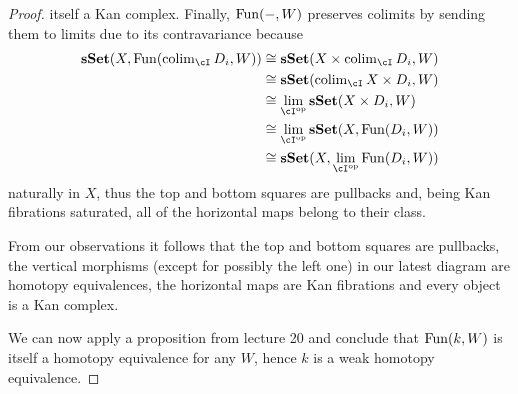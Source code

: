\documentclass[a4paper,11pt,openany]{scrartcl}
\begin{document}
\begin{proof}
    itself a Kan complex. Finally, $\operatorname{Fun}(-,W)$ preserves colimits by sending
    them to limits due to its contravariance because
    \begin{align*}
        \sSet(X,\Fun(\colim_{\cI}D_i,W))
        &\cong\sSet(X\times\colim_{\cI}D_i,W) \\
        &\cong\sSet(\colim_{\cI} X\times D_i,W) \\
        &\cong\lim_{\cI^{\op}}\sSet(X\times D_i,W) \\
        &\cong\lim_{\cI^{\op}}\sSet(X,\Fun(D_i,W)) \\
        &\cong\sSet(X,\lim_{\cI^{\op}}\Fun(D_i,W))
    \end{align*}
    naturally in $X$,
    thus the top and bottom squares are pullbacks and, being Kan fibrations
    saturated, all of the horizontal maps belong to their class.

    From our observations it follows that the top and bottom squares are
    pullbacks, the vertical morphisms (except for possibly the left one) in our
    latest diagram are homotopy equivalences, the horizontal maps are Kan
    fibrations and every object is a Kan complex.

    We can now apply a proposition from lecture 20 and conclude that $\operatorname{Fun}(k,W)$
    is itself a homotopy equivalence for any $W$, hence $k$ is a weak homotopy
    equivalence.
\end{proof}
\end{document}
